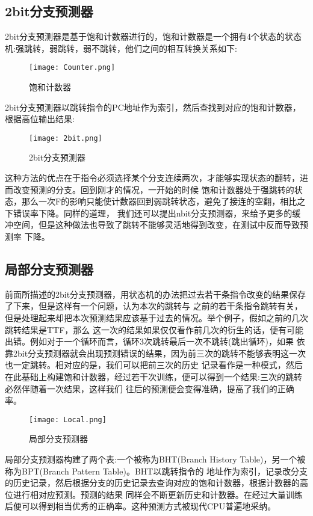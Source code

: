 \documentclass[forprint]{WHUBachelor}
\begin{document}
  
  
  
  \subsection{2bit分支预测器}
2bit分支预测器是基于饱和计数器进行的，饱和计数器是一个拥有4个状态的状态机:强跳转，弱跳转，弱不跳转，他们之间的相互转换关系如下:\par
\begin{figure}[ht]
  \centering
    \texttt{[image: Counter.png]}
    \caption{饱和计数器}
    \label{fig:1}
  \end{figure}
2bit分支预测器以跳转指令的PC地址作为索引，然后查找到对应的饱和计数器，根据高位输出结果:\par
\begin{figure}[ht]
  \centering
    \texttt{[image: 2bit.png]}
    \caption{2bit分支预测器}
    \label{fig:2}
  \end{figure}
这种方法的优点在于指令必须选择某个分支连续两次，才能够实现状态的翻转，进而改变预测的分支。回到刚才的情况，一开始的时候
饱和计数器处于强跳转的状态，那么一次F的影响只能使计数器回到弱跳转状态，避免了接连的空翻，相比之下错误率下降。同样的道理，
我们还可以提出nbit分支预测器，来给予更多的缓冲空间，但是这种做法也导致了跳转不能够灵活地得到改变，在测试中反而导致预测率
下降。

 \subsection{局部分支预测器}
 前面所描述的2bit分支预测器，用状态机的办法把过去若干条指令改变的结果保存了下来，但是这样有一个问题，认为本次的跳转与
 之前的若干条指令跳转有关，但是处理起来却把本次预测结果应该基于过去的情况。举个例子，假如之前的几次跳转结果是TTF，那么
 这一次的结果如果仅仅看作前几次的衍生的话，便有可能出错。例如对于一个循环而言，循环3次跳转最后一次不跳转(跳出循环)，如果
 依靠2bit分支预测器就会出现预测错误的结果，因为前三次的跳转不能够表明这一次也一定跳转。相对应的是，我们可以把前三次的历史
 记录看作是一种模式，然后在此基础上构建饱和计数器，经过若干次训练，便可以得到一个结果:三次的跳转必然伴随着一次结果，这样我们
 往后的预测便会变得准确，提高了我们的正确率。\par
 \begin{figure}[ht]
  \centering
    \texttt{[image: Local.png]}
    \caption{局部分支预测器}
    \label{fig:3}
  \end{figure}
 局部分支预测器构建了两个表:一个被称为BHT(Branch History Table)，另一个被称为BPT(Branch Pattern Table)。BHT以跳转指令的
 地址作为索引，记录改分支的历史记录，然后根据分支的历史记录去查询对应的饱和计数器，根据计数器的高位进行相对应预测。预测的结果
 同样会不断更新历史和计数器。在经过大量训练后便可以得到相当优秀的正确率。这种预测方式被现代CPU普遍地采纳。
\end{document}
